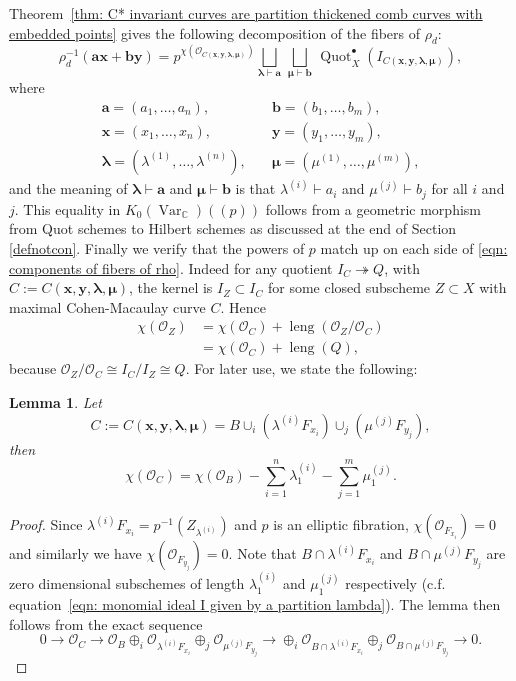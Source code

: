 \documentclass[12pt]{amsart}
\newtheorem{lemma}[theorem]{Lemma}
\theoremstyle{definition}
\newcommand{\CC} {\mathbb{C}}          %
\renewcommand{\O}{\mathcal{O}}
\newcommand{\Quot}{\operatorname{Quot}}
\newcommand{\Var}{\operatorname{Var}}
\newcommand{\boldx}{\boldsymbol{x}}
\newcommand{\boldy}{\boldsymbol{y}}
\newcommand{\bolda}{\boldsymbol{a}}
\newcommand{\boldb}{\boldsymbol{b}}
\newcommand{\boldlambda}{\boldsymbol{\lambda }}
\newcommand{\boldmu}{\boldsymbol{\mu }}
\newcommand{\length}{\operatorname{leng}}
\begin{document}
Theorem~\ref{thm: C* invariant curves are
partition thickened comb curves with embedded points} gives the
following decomposition of the fibers of $\rho_{d}$:
\begin{equation} \label{eqn: components of fibers of rho}
\rho_{d}^{-1}(\bolda \boldx +\boldb \boldy ) = p^{\chi(\O_{C(\boldx, \boldy, \boldlambda, \boldmu)})} \bigsqcup_{\boldlambda
\vdash \bolda}\, \bigsqcup_{\boldmu \vdash \boldb}\,  \Quot_X^{\bullet}(I_{C(\boldx, \boldy, \boldlambda, \boldmu)}),
\end{equation}
where 
\begin{align*}
\bolda =(a_{1},\dotsc ,a_{n}),&\quad \boldb =(b_{1},\dotsc
,b_{m}),\\
\boldx =(x_{1},\dotsc ,x_{n}),&\quad \boldy =(y_{1},\dotsc
,y_{m}),\\
\boldlambda =(\lambda^{(1)},\dotsc ,\lambda^{(n)}),&\quad \boldmu =(\mu^{(1)},\dotsc ,\mu^{(m)}),
\end{align*}
and the meaning of $\boldlambda \vdash \bolda$ and $\boldmu \vdash
\boldb$ is that $\lambda^{(i)}\vdash a_{i}$ and $\mu^{(j)}\vdash
b_{j}$ for all $i$ and $j$. This equality in $K_{0}(\Var_{\CC})(\!(p)\!)$ follows from a geometric morphism from Quot schemes to Hilbert schemes as discussed at the end of Section \ref{defnotcon}. Finally we verify that the powers of $p$ match up on each side of \eqref{eqn: components of fibers of rho}. Indeed for any quotient $I_C \twoheadrightarrow Q$, with $C := C(\boldx, \boldy, \boldlambda, \boldmu)$, the kernel is $I_Z \subset I_C$ for some closed subscheme $Z \subset X$ with maximal Cohen-Macaulay curve $C$. Hence
\begin{align*}
\chi (\O_{Z})&=\chi (\O_{C}) +\length (\O_Z / \O_C) \\
&=\chi (\O_{C}) +\length (Q),
\end{align*}
because $\O_Z / \O_C \cong I_C / I_Z \cong Q$. For later use, we state the following:

\begin{lemma}\label{lem: chi(C)=chi(B) -sum lamba1 - sum mu1}
Let 
\[
C:=C(\boldx, \boldy, \boldlambda, \boldmu)=B\cup_{i}\left(\lambda^{(i)}F_{x_{i}} \right)\cup_{j}\left(\mu^{(j)}F_{y_{j}} \right),
\]
then
\[
\chi (\O_{C}) = \chi (\O_{B}) -\sum_{i=1}^{n}\lambda^{(i)}_{1}
-\sum_{j=1}^{m}\mu^{(j)}_{1}. 
\]
\end{lemma}
\begin{proof}
Since $\lambda^{(i)}F_{x_{i}}=p^{-1}(Z_{\lambda^{(i)}})$ and $p$ is an
elliptic fibration, $\chi (\O_{F_{x_{i}}})=0$ and similarly we have
$\chi (\O_{F_{y_{j}}})=0$. Note that $B\cap \lambda^{(i)}F_{x_{i}}$
and $B\cap \mu^{(j)}F_{y_{j}}$ are zero dimensional subschemes of
length $\lambda^{(i)}_{1}$ and $\mu^{(j)}_{1} $ respectively
(c.f. equation~\eqref{eqn: monomial ideal I given by a partition
lambda}). The lemma then follows from the exact sequence
\[
0\to \O_{C} \to
\O_{B}\oplus_{i}\O_{\lambda^{(i)}F_{x_{i}}}\oplus_{j}\O_{\mu^{(j)}F_{y_{j}}}
\to \oplus_{i}\O_{B\cap \lambda^{(i)}F_{x_{i}}}\oplus_{j}\O_{B\cap \mu^{(j)}F_{y_{j}}}  \to 0.
\]
\end{proof}
\end{document}
